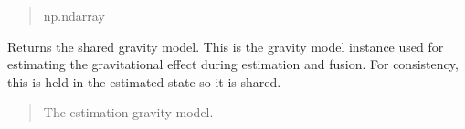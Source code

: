 \documentclass[letterpaper,10pt,english]{sphinxmanual}
\begin{document}
\begin{fulllineitems}
\begin{fulllineitems}
\begin{quote}
\begin{description}
\sphinxAtStartPar
np.ndarray

\end{description}\end{quote}

\end{fulllineitems}


\begin{fulllineitems}
\label{\detokenize{modules/estimation/state:qnav.estimation.state.EstimatedState.gravity_model}}
\pysigstartsignatures
{}
\pysigstopsignatures
\sphinxAtStartPar
Returns the shared gravity model.
This is the gravity model instance used for estimating the
gravitational effect during estimation and fusion. For consistency,
this is held in the estimated state so it is shared.
\begin{quote}\begin{description}
\sphinxAtStartPar
The estimation gravity model.

\sphinxAtStartPar
{\hyperref[\detokenize{modules/gravity/base:qnav.gravity.base.GravityModel}]{}}

\end{description}\end{quote}

\end{fulllineitems}



\end{fulllineitems}
\end{document}

